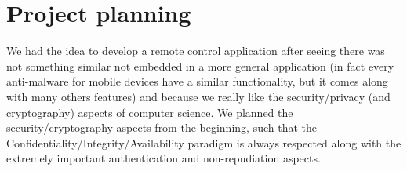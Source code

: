 \noindent
\Huge{\section{Project planning}} 
\small{We had the idea to develop a remote control application after seeing there was not something similar not embedded in a more general application (in fact every anti-malware for mobile devices have a similar functionality, but it comes along with many others features) and because we really like the security/privacy (and cryptography) aspects of computer science. We planned the security/cryptography aspects from the beginning, such that the Confidentiality/Integrity/Availability paradigm is always respected along with the extremely important authentication and non-repudiation aspects.}